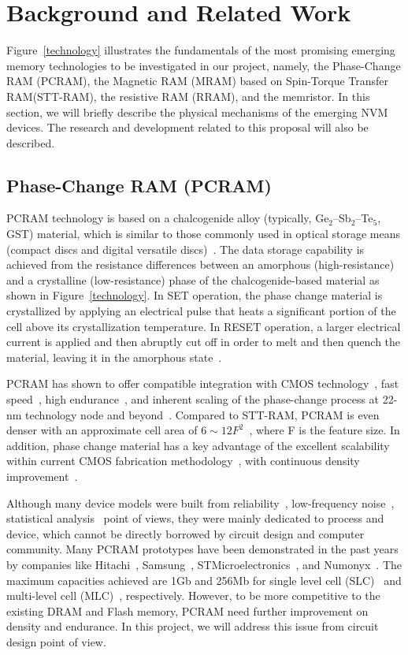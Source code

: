 \section{Background and Related Work}

Figure~\ref{technology} illustrates the fundamentals of the most promising emerging memory technologies to be investigated in our project, namely, the Phase-Change RAM (PCRAM), the Magnetic RAM (MRAM) based on Spin-Torque Transfer RAM(STT-RAM), the resistive RAM (RRAM), and the memristor. In this section, we will briefly describe the physical mechanisms of the emerging NVM devices. The research and development related to this proposal will also be described.

\subsection{Phase-Change RAM (PCRAM)}
PCRAM technology is based on a chalcogenide alloy (typically, Ge$_2$--Sb$_2$--Te$_5$, GST) material, which is similar to those commonly used in optical storage means (compact discs and digital versatile discs)~\cite{Bedeschi09}. The data storage capability is achieved from the resistance differences between an amorphous (high-resistance) and a crystalline (low-resistance) phase of the chalcogenide-based material as shown in Figure~\ref{technology}. In SET operation, the phase change material is crystallized by applying an electrical pulse that heats a significant portion of the cell above its crystallization temperature. In RESET operation, a larger electrical current is applied and then abruptly cut off in order to melt and then quench the material, leaving it in the amorphous state~\cite{burr:scm08}.

PCRAM has shown to offer compatible integration with CMOS technology~\cite{Oh06}, fast speed~\cite{Pirovano03}, high endurance~\cite{Lai03}, and inherent scaling of the phase-change process at 22-nm technology node and beyond~\cite{Chen06}. Compared to STT-RAM, PCRAM is even denser with an approximate cell area of $6\sim12F^2$~\cite{ITRS07}, where F is the feature size. In addition, phase change material has a key advantage of the excellent scalability within current CMOS fabrication methodology~\cite{Cho05,Kim06,Lai01,Pirovano03,Raoux08}, with continuous density improvement~\cite{Nirschl07,Chen07-iedm,Im08}.

Although many device models were built from reliability~\cite{Ielmini07}, low-frequency noise~\cite{Fantini08}, statistical analysis~\cite{Mantegazza07} point of views, they were mainly dedicated to process and device, which cannot be directly borrowed by circuit design and computer community. Many PCRAM prototypes have been demonstrated in the past years by companies like Hitachi~\cite{Hanzawa07}, Samsung~\cite{Lee07-isscc}, STMicroelectronics~\cite{Bedeschi08, Sandre10}, and Numonyx~\cite{Villa10}. The maximum capacities achieved are 1Gb and 256Mb for single level cell (SLC)~\cite{Villa10} and multi-level cell (MLC)~\cite{Lee07-isscc}, respectively. However, to be more competitive to the existing DRAM and Flash memory, PCRAM need further improvement on density and endurance. In this project, we will address this issue from circuit design point of view.

